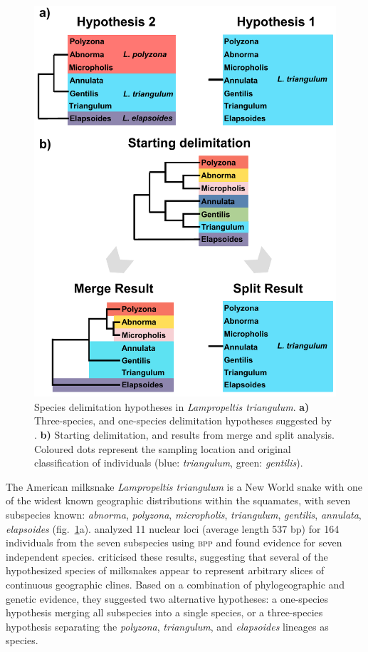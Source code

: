 \documentclass[A4]{article1}
\begin{document}
\begin{figure}
    \includegraphics[scale=0.18]{figs/fig-miksnakes-results} %
    
    \caption{Species delimitation hypotheses in \textit{Lampropeltis triangulum}.
    \textbf{a)} Three-species, and one-species delimitation hypotheses suggested by
    \citet{Chambers2020}.  \textbf{b)} Starting delimitation, and results from merge and
    split analysis. \\ %
    Coloured dots represent the sampling location and original classification of
    individuals (blue: \textit{triangulum}, green: \textit{gentilis}). %
} \label{fig:milksnake}
\end{figure} 

The  American milksnake \textit{Lampropeltis triangulum} is a New World snake with one of
the widest known geographic distributions within the squamates, with seven subspecies
known: \textit{abnorma}, \textit{polyzona}, \textit{micropholis}, \textit{triangulum},
\textit{gentilis}, \textit{annulata}, \textit{elapsoides} (fig.~\ref{fig:milksnake}a).  
\citet{Ruane2014} analyzed 11 nuclear loci (average length 537 bp) for 164 individuals
from the seven subspecies using \textsc{bpp} and found evidence for seven independent
species. \citet{Chambers2020} criticised these results, suggesting that several of the
hypothesized species of milksnakes appear to represent arbitrary slices of continuous
geographic clines.  Based on a combination of phylogeographic and genetic evidence, they
suggested two alternative hypotheses: a one-species hypothesis merging all subspecies into
a single species, or a three-species hypothesis separating the \textit{polyzona},
\textit{triangulum}, and \textit{elapsoides} lineages as species.
\end{document}
